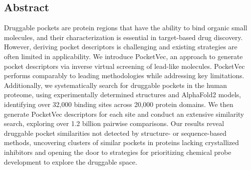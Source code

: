 \subsection{Abstract}


Druggable pockets are protein regions that have the ability to bind organic small molecules, and their characterization is essential in target-based drug discovery. However, deriving pocket descriptors is challenging and existing strategies are often limited in applicability. We introduce PocketVec, an approach to generate pocket descriptors via inverse virtual screening of lead-like molecules. PocketVec performs comparably to leading methodologies while addressing key limitations. Additionally, we systematically search for druggable pockets in the human proteome, using experimentally determined structures and AlphaFold2 models, identifying over 32,000 binding sites across 20,000 protein domains. We then generate PocketVec descriptors for each site and conduct an extensive similarity search, exploring over 1.2 billion pairwise comparisons. Our results reveal druggable pocket similarities not detected by structure- or sequence-based methods, uncovering clusters of similar pockets in proteins lacking crystallized inhibitors and opening the door to strategies for prioritizing chemical probe development to explore the druggable space.